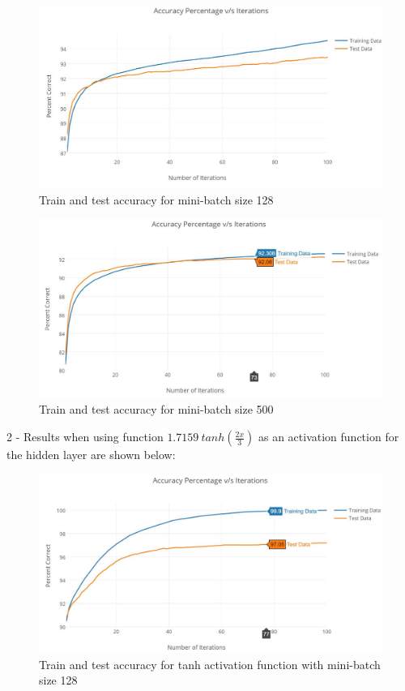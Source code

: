 \documentclass{article}
\begin{document}
\begin{figure}[h!]
  \centering
  \includegraphics[width=117mm]{graphs/Q4a_point1_128.JPG}
  \caption{Train and test accuracy for mini-batch size 128}
  \label{fig:4a_2}
\end{figure}

\begin{figure}[h!]
  \centering
  \includegraphics[width=117mm]{graphs/Q4a_point1_500.JPG}
  \caption{Train and test accuracy for mini-batch size 500}
  \label{fig:4a_3}
\end{figure}

2 - Results when using function $1.7159\:tanh(\frac{2x}{3})$ as an activation function for the hidden layer are shown below:

\begin{figure}[h!]
  \centering
  \includegraphics[width=\linewidth]{graphs/Q4c_point1_128_tanh.JPG}
  \caption{Train and test accuracy for tanh activation function with mini-batch size 128}
  \label{fig:4c}
\end{figure}
\pagebreak
\end{document}
